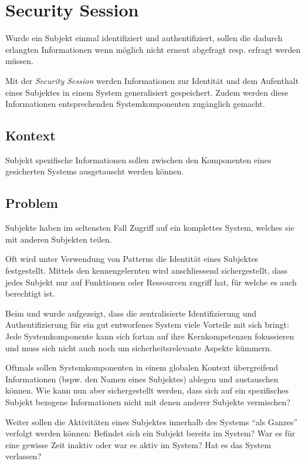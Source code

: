 \section{Security Session}
Wurde ein Subjekt einmal identifiziert und authentifiziert, sollen die dadurch erlangten Informationen wenn möglich nicht erneut abgefragt resp. erfragt werden müssen.

Mit der \emph{Security Session} werden Informationen zur Identität und dem Aufenthalt eines Subjektes in einem System generalisiert gespeichert. Zudem werden diese Informationen entsprechenden Systemkomponenten zugänglich gemacht.

\subsection*{Kontext}
Subjekt spezifische Informationen sollen zwischen den Komponenten eines gesicherten Systems ausgetauscht werden können.

\subsection*{Problem}
Subjekte haben im seltensten Fall Zugriff auf ein komplettes System, welches sie mit anderen Subjekten teilen.

Oft wird unter Verwendung von \emph{} Patterns die Identität eines Subjektes festgestellt. Mittels den kennengelernten \emph{} wird anschliessend sichergestellt, dass jedes Subjekt nur auf Funktionen oder Ressourcen zugriff hat, für welche es auch berechtigt ist.

Beim \emph{} und \emph{} wurde aufgezeigt, dass die zentralisierte Identifizierung und Authentifizierung für ein gut entworfenes System viele Vorteile mit sich bringt: Jede Systemkomponente kann sich fortan auf ihre Kernkompetenzen fokussieren und muss sich nicht auch noch um sicherheitsrelevante Aspekte kümmern.

Oftmals sollen Systemkomponenten in einem globalen Kontext übergreifend Informationen (bspw. den Namen eines Subjektes) ablegen und austauschen können. Wie kann nun aber sichergestellt werden, dass sich auf ein spezifisches Subjekt bezogene Informationen nicht mit denen anderer Subjekte vermischen?

Weiter sollen die Aktivitäten eines Subjektes innerhalb des Systems ``als Ganzes'' verfolgt werden können: Befindet sich ein Subjekt bereits im System? War es für eine gewisse Zeit inaktiv oder war es aktiv im System? Hat es das System verlassen?



